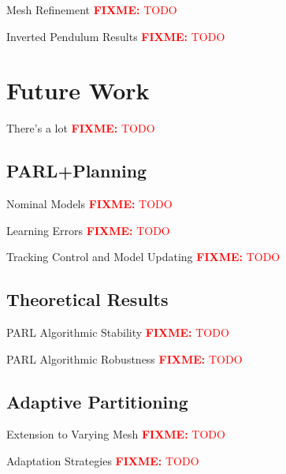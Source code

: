 \documentclass{beamer}
\newcommand\fixme[2][FIXME]{\textcolor{red}{\textbf{#1:} #2}}
\begin{document}
\begin{frame}{Mesh Refinement}
  \fixme{TODO}
\end{frame}

\begin{frame}{Inverted Pendulum Results}
  \fixme{TODO}
\end{frame}

\section{Future Work}

\begin{frame}{There's a lot}
  \fixme{TODO}
\end{frame}

\subsection{PARL+Planning}

\begin{frame}{Nominal Models}
  \fixme{TODO}
\end{frame}

\begin{frame}{Learning Errors}
  \fixme{TODO}
\end{frame}

\begin{frame}{Tracking Control and Model Updating}
  \fixme{TODO}
\end{frame}

\subsection{Theoretical Results}

\begin{frame}{PARL Algorithmic Stability}
  \fixme{TODO}
\end{frame}

\begin{frame}{PARL Algorithmic Robustness}
  \fixme{TODO}
\end{frame}

\subsection{Adaptive Partitioning}

\begin{frame}{Extension to Varying Mesh}
  \fixme{TODO}
\end{frame}

\begin{frame}{Adaptation Strategies}
  \fixme{TODO}
\end{frame}
\end{document}

